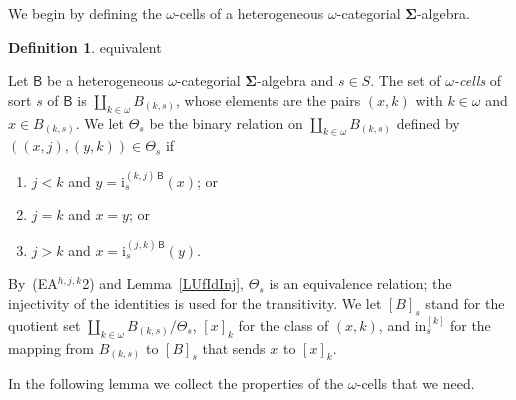 \documentclass[a4paper, reqno]{amsbook}
\makeatletter
\newcommand{\sig}[1]{\mathbf{#1}}             %
\newcommand{\calg}[1]{\boldsymbol{\mathsf{#1}}} %
\theoremstyle{plain}
\theoremstyle{definition}
\newtheorem{definition}[theorem]{Definition}
\newcommand*{\CA@leanpending}{}
\newcommand*{\CA@leanrelation}{}
\newcommand*{\lean}[2]{%
  \ifcsname\string\color@lean@#1\endcsname\else
    \PackageError{main}{Unknown relation `#1' in \string\lean}{Use equivalent, weaker or stronger.}%
  \fi
  \gdef\CA@leanrelation{#1}%
  \gdef\CA@leanpending{#2}}
\makeatother
\begin{document}
We begin by defining the $\omega$-cells of a heterogeneous $\omega$-categorial $\sig{\Sigma}$-algebra.

\begin{definition}\label{DUfCellsOmega}\lean{equivalent}{Omega.Cell,Omega.cellSetoid,Omega.cellIn_eq_iff_comparable}
Let $\calg{B}$ be a heterogeneous $\omega$-categorial $\sig{\Sigma}$-algebra and $s\in S$.
The set of \emph{$\omega$-cells} of sort $s$ of $\calg{B}$ is $\coprod_{k\in\omega}B_{(k,s)}$, whose elements are the pairs $(x,k)$ with $k\in\omega$ and $x\in B_{(k,s)}$.
We let $\Theta_{s}$ be the binary relation on $\coprod_{k\in\omega}B_{(k,s)}$ defined by $((x,j),(y,k))\in\Theta_{s}$ if
\begin{enumerate}
\item $j<k$ and $y=\mathrm{i}^{(k,j)\,\calg{B}}_{s}(x)$; or
\item $j=k$ and $x=y$; or
\item $j>k$ and $x=\mathrm{i}^{(j,k)\,\calg{B}}_{s}(y)$.
\end{enumerate}
By~(EA$^{h,j,k}$2) and Lemma~\ref{LUfIdInj}, $\Theta_{s}$ is an equivalence relation; the injectivity of the identities is used for the transitivity.
We let $[B]_{s}$ stand for the quotient set $\coprod_{k\in\omega}B_{(k,s)}/\Theta_{s}$, $[x]_{k}$ for the class of $(x,k)$, and $\mathrm{in}^{[k]}_{s}$ for the mapping from $B_{(k,s)}$ to $[B]_{s}$ that sends $x$ to $[x]_{k}$.
\end{definition}

In the following lemma we collect the properties of the $\omega$-cells that we need.
\end{document}
